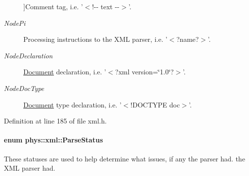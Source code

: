 \begin{Desc}
\begin{description}
{}]Comment tag, i.e. '$<$!-\/-\/ text -\/-\/$>$'. \item[{\em 
\hypertarget{namespacephys_1_1xml_a668b0cc666a9d49f7c7222a7552115d3a3c09d11be0cea840f23f55e084cf72fa}{
NodePi}
\label{namespacephys_1_1xml_a668b0cc666a9d49f7c7222a7552115d3a3c09d11be0cea840f23f55e084cf72fa}
}]Processing instructions to the XML parser, i.e. '$<$?name?$>$'. \item[{\em 
\hypertarget{namespacephys_1_1xml_a668b0cc666a9d49f7c7222a7552115d3a1e3789aa995b7bf563ca8c43553ac035}{
NodeDeclaration}
\label{namespacephys_1_1xml_a668b0cc666a9d49f7c7222a7552115d3a1e3789aa995b7bf563ca8c43553ac035}
}]\hyperlink{classphys_1_1xml_1_1Document}{Document} declaration, i.e. '$<$?xml version=\char`\"{}1.0\char`\"{}?$>$'. \item[{\em 
\hypertarget{namespacephys_1_1xml_a668b0cc666a9d49f7c7222a7552115d3aca750034b7e4a34d53cfd3399b2bcd99}{
NodeDocType}
\label{namespacephys_1_1xml_a668b0cc666a9d49f7c7222a7552115d3aca750034b7e4a34d53cfd3399b2bcd99}
}]\hyperlink{classphys_1_1xml_1_1Document}{Document} type declaration, i.e. '$<$!DOCTYPE doc$>$'. \end{description}
\end{Desc}



Definition at line 185 of file xml.h.

\hypertarget{namespacephys_1_1xml_ae7aabb879b21c73d8183a54470f8917f}{
\paragraph[{ParseStatus}]{\setlength{\rightskip}{0pt plus 5cm}enum {\bf phys::xml::ParseStatus}}\hfill}
\label{namespacephys_1_1xml_ae7aabb879b21c73d8183a54470f8917f}


These statuses are used to help determine what issues, if any the parser had. the XML parser had. 


